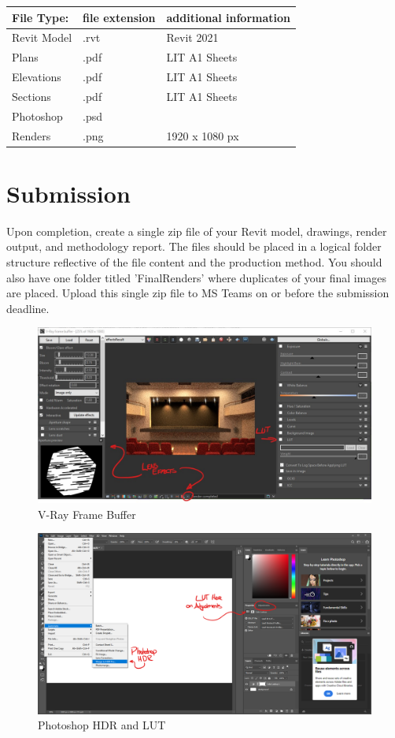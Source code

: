 \begin{tabularx}{\textwidth}{ |X|X|X| }
	\hline
	\textbf{File Type:} & file extension & additional information\\
	\hline 
	Revit Model  & .rvt & Revit 2021 \\
	Plans & .pdf & LIT A1 Sheets \\
	Elevations & .pdf & LIT A1 Sheets \\
	Sections & .pdf & LIT A1 Sheets \\
	Photoshop  & .psd &  \\	
	Renders  & .png & 1920 x 1080 px\\
	\hline
\end{tabularx}




\section*{Submission}
Upon completion, create a single zip file of your Revit model, drawings, render output, and methodology report.  The files should be placed in a logical folder structure reflective of the file content and the production method.  You should also have one folder titled 'FinalRenders' where duplicates of your final images are placed.  Upload this single zip file to MS Teams on or before the submission deadline.


\begin{figure}[h]
	\centering
	\includegraphics[width=1.0\linewidth]{./img/VRayFrameBuffer.jpg}
	\caption{V-Ray Frame Buffer}
	\label{fig:VRayFrameBuffer}
\end{figure}

\begin{figure}[h]
	\centering
	\includegraphics[width=1.0\linewidth]{./img/Photoshop.png}
	\caption{Photoshop HDR and LUT}
	\label{fig:PS-HDR-LUT}
\end{figure}



